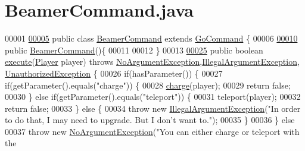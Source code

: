 \hypertarget{BeamerCommand_8java_source}{\section{Beamer\-Command.\-java}
}

\begin{DoxyCode}
00001 
\hypertarget{BeamerCommand_8java_source_l00005}{}\hyperlink{classBeamerCommand}{00005} \textcolor{keyword}{public} \textcolor{keyword}{class }\hyperlink{classBeamerCommand}{BeamerCommand} \textcolor{keyword}{extends} \hyperlink{classGoCommand}{GoCommand} \{
00006 
\hypertarget{BeamerCommand_8java_source_l00010}{}\hyperlink{classBeamerCommand_accb1d84a69588f1b42fba96bf1b32de5}{00010}     \textcolor{keyword}{public} \hyperlink{classBeamerCommand_accb1d84a69588f1b42fba96bf1b32de5}{BeamerCommand}()\{
00011 
00012     \}
00013 
\hypertarget{BeamerCommand_8java_source_l00025}{}\hyperlink{classBeamerCommand_ab28a7d743569841e463b2c0c65cf6eb1}{00025}     \textcolor{keyword}{public} \textcolor{keywordtype}{boolean} \hyperlink{classBeamerCommand_ab28a7d743569841e463b2c0c65cf6eb1}{execute}(\hyperlink{classPlayer}{Player} player) \textcolor{keywordflow}{throws} 
      \hyperlink{classNoArgumentException}{NoArgumentException},\hyperlink{classIllegalArgumentException}{IllegalArgumentException},
      \hyperlink{classUnauthorizedException}{UnauthorizedException} \{
00026         \textcolor{keywordflow}{if}(hasParameter()) \{
00027             \textcolor{keywordflow}{if}(getParameter().equals(\textcolor{stringliteral}{"charge"})) \{
00028                 \hyperlink{classBeamerCommand_a130a572b2ec0532c92ea5033a098b1ac}{charge}(player);
00029                 \textcolor{keywordflow}{return} \textcolor{keyword}{false};
00030             \} \textcolor{keywordflow}{else} \textcolor{keywordflow}{if}(getParameter().equals(\textcolor{stringliteral}{"teleport"})) \{
00031                 teleport(player);
00032                 \textcolor{keywordflow}{return} \textcolor{keyword}{false};
00033             \} \textcolor{keywordflow}{else} \{
00034                 \textcolor{keywordflow}{throw} \textcolor{keyword}{new} \hyperlink{classIllegalArgumentException}{IllegalArgumentException}(\textcolor{stringliteral}{"In order to do that, I may need
       to upgrade. But I don't want to."});
00035             \}
00036         \} \textcolor{keywordflow}{else} 
00037             \textcolor{keywordflow}{throw} \textcolor{keyword}{new} \hyperlink{classNoArgumentException}{NoArgumentException}(\textcolor{stringliteral}{"You can either charge or teleport with the
}
\end{DoxyCode}
